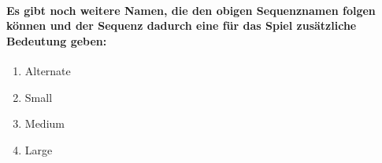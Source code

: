 \paragraph { Es gibt noch weitere Namen, die den obigen Sequenznamen folgen können und der Sequenz dadurch eine für das Spiel zusätzliche Bedeutung geben: }
\begin{enumerate}
	\item Alternate
	\item Small
	\item Medium
	\item Large
\end{enumerate}